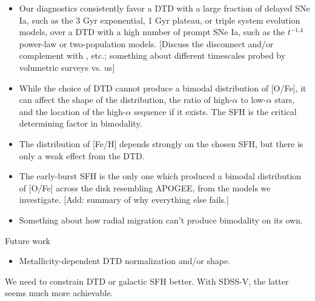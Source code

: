 \documentclass[twocolumn,twocolappendix,linenumbers,trackchanges]{aastex631}
\begin{document}
\begin{itemize}

    \item Our diagnostics consistently favor a DTD with a large fraction of delayed SNe Ia, such as the 3 Gyr exponential, 1 Gyr plateau, or triple system evolution models, over a DTD with a high number of prompt SNe Ia, such as the $t^{-1.4}$ power-law or two-population models. [Discuss the disconnect and/or complement with \citet{Maoz2017-CosmicDTD}, etc.; something about different timescales probed by volumetric surveys vs. us]
    
    \item While the choice of DTD cannot produce a bimodal distribution of [O/Fe], it can affect the shape of the distribution, the ratio of high-$\alpha$ to low-$\alpha$ stars, and the location of the high-$\alpha$ sequence if it exists. The SFH is the critical determining factor in bimodality.

    \item The distribution of [Fe/H] depends strongly on the chosen SFH, but there is only a weak effect from the DTD.

    \item The early-burst SFH is the only one which produced a bimodal distribution of [O/Fe] across the disk resembling APOGEE, from the models we investigate. [Add: summary of why everything else fails.]

    \item Something about how radial migration can't produce bimodality on its own.
    
\end{itemize}

Future work
\begin{itemize}
    \item Metallicity-dependent DTD normalization and/or shape.
\end{itemize}

We need to constrain DTD or galactic SFH better. With SDSS-V, the latter seems much more achievable.
\end{document}
